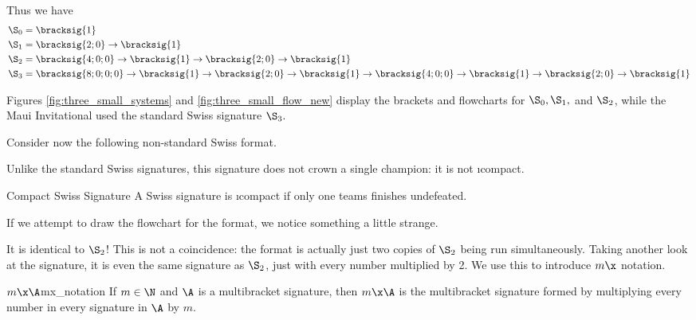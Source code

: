 {    Thus we have
    \begin{align*}
        \S_0 =\; &\bracksig{1}\\
        \S_1 =\; &\bracksig{2;0} \to \bracksig{1}\\
        \S_2 =\; &\bracksig{4;0;0} \to \bracksig{1} \to \bracksig{2;0} \to \bracksig{1}\\
        \S_3 =\; &\bracksig{8;0;0;0} \to \bracksig{1} \to \bracksig{2;0} \to \bracksig{1} \to \bracksig{4;0;0} \to \bracksig{1} \to \bracksig{2;0} \to \bracksig{1}
    \end{align*}

    Figures \ref{fig:three_small_systems} and \ref{fig:three_small_flow_new} display the brackets and flowcharts for $\S_0, \S_1,$ and $\S_2$, while the Maui Invitational used the standard Swiss signature $\S_3.$


    Consider now the following non-standard Swiss format.
    

    Unlike the standard Swiss signatures, this signature does not crown a single champion: it is not \i{compact}.

    \begin{definition}{Compact Swiss Signature}{}
       A Swiss signature is \i{compact} if only one teams finishes undefeated.
    \end{definition}

    If we attempt to draw the flowchart for the format, we notice something a little strange.


    It is identical to $\S_2$! This is not a coincidence: the format is actually just two copies of $\S_2$ being run simultaneously. Taking another look at the signature, it is even the same signature as $\S_2$, just with every number multiplied by 2. We use this to introduce $m\x$ notation.

    \begin{definition}{$m\x\A$}{mx_notation}
         If $m \in \N$ and $\A$ is a multibracket signature, then $m\x\A$ is the multibracket signature formed by multiplying every number in every signature in $\A$ by $m$.
    \end{definition}

}
